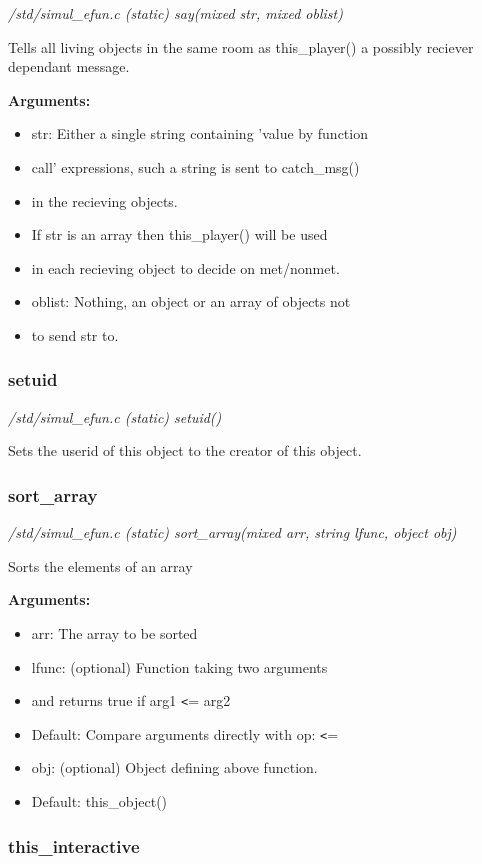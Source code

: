 {\em /std/simul\_efun.c (static) say(mixed str, mixed oblist)}

Tells all living objects in the same room as this\_player()
a possibly reciever dependant message.

{\bf Arguments:}
\begin{itemize}
\item      str: Either a single string containing 'value by function
\item call' expressions, such a string is sent to catch\_msg()
\item in the recieving objects.
\item If str is an array then this\_player() will be used 
\item in each recieving object to decide on met/nonmet.
\item oblist: Nothing, an object or an array of objects not
\item to send str to.
\end{itemize}


\subsubsection{setuid}

{\em /std/simul\_efun.c (static) setuid()}

Sets the userid of this object to the creator of this object.


\subsubsection{sort\_array}

{\em /std/simul\_efun.c (static) sort\_array(mixed arr, string lfunc, object obj)}

Sorts the elements of an array

{\bf Arguments:}
\begin{itemize}
\item       arr: The array to be sorted
\item lfunc: (optional) Function taking two arguments
\item and returns true if arg1 \verb+<+= arg2
\item Default: Compare arguments directly with op: \verb+<+=
\item obj: (optional) Object defining above function.
\item Default: this\_object()
\end{itemize}


\subsubsection{this\_interactive}

